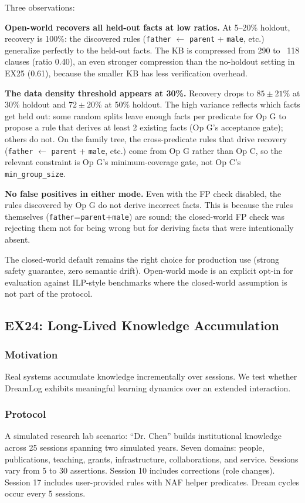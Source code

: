 \documentclass[10pt,conference]{IEEEtran}
\begin{document}
Three observations:

\textbf{Open-world recovers all held-out facts at low ratios.} At 5--20\% holdout, recovery is 100\%: the discovered rules (\texttt{father} $\leftarrow$ \texttt{parent} + \texttt{male}, etc.) generalize perfectly to the held-out facts. The KB is compressed from 290 to ~118 clauses (ratio 0.40), an even stronger compression than the no-holdout setting in EX25 (0.61), because the smaller KB has less verification overhead.

\textbf{The data density threshold appears at 30\%.} Recovery drops to $85 \pm 21$\% at 30\% holdout and $72 \pm 20$\% at 50\% holdout. The high variance reflects which facts get held out: some random splits leave enough facts per predicate for Op G to propose a rule that derives at least 2 existing facts (Op G's acceptance gate); others do not. On the family tree, the cross-predicate rules that drive recovery (\texttt{father} $\leftarrow$ \texttt{parent} + \texttt{male}, etc.) come from Op G rather than Op C, so the relevant constraint is Op G's minimum-coverage gate, not Op C's \texttt{min\_group\_size}.

\textbf{No false positives in either mode.} Even with the FP check disabled, the rules discovered by Op G do not derive incorrect facts. This is because the rules themselves (\texttt{father}=\texttt{parent}+\texttt{male}) are sound; the closed-world FP check was rejecting them not for being wrong but for deriving facts that were intentionally absent.

The closed-world default remains the right choice for production use (strong safety guarantee, zero semantic drift). Open-world mode is an explicit opt-in for evaluation against ILP-style benchmarks where the closed-world assumption is not part of the protocol.

\subsection{EX24: Long-Lived Knowledge Accumulation}
\label{sec:ex24}

\subsubsection{Motivation}
Real systems accumulate knowledge incrementally over sessions. We test whether DreamLog exhibits meaningful learning dynamics over an extended interaction.

\subsubsection{Protocol}
A simulated research lab scenario: ``Dr. Chen'' builds institutional knowledge across 25 sessions spanning two simulated years. Seven domains: people, publications, teaching, grants, infrastructure, collaborations, and service. Sessions vary from 5 to 30 assertions. Session 10 includes corrections (role changes). Session 17 includes user-provided rules with NAF helper predicates. Dream cycles occur every 5 sessions.
\end{document}
